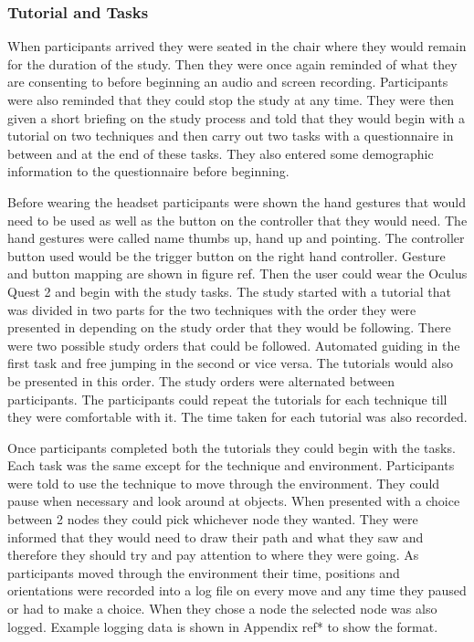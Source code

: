 \subsubsection{Tutorial and Tasks}
\label{subsubsection DPUS SP SP: Tutorial and Tasks}
When participants arrived they were seated in the chair where they would remain for the duration of the study. Then they were once again reminded of what they are consenting to before beginning an audio and screen recording. Participants were also reminded that they could stop the study at any time. They were then given a short briefing on the study process and told that they would begin with a tutorial on two techniques and then carry out two tasks with a questionnaire in between and at the end of these tasks. They also entered some demographic information to the questionnaire before beginning.

Before wearing the headset participants were shown the hand gestures that would need to be used as well as the button on the controller that they would need. The hand gestures were called name thumbs up, hand up and pointing. The controller button used would be the trigger button on the right hand controller. Gesture and button mapping are shown in figure ref. Then the user could wear the Oculus Quest 2 and begin with the study tasks. The study started with a tutorial that was divided in two parts for the two techniques with the order they were presented in depending on the study order that they would be following. There were two possible study orders that could be followed. Automated guiding in the first task and free jumping in the second or vice versa. The tutorials would also be presented in this order. The study orders were alternated between participants. The participants could repeat the tutorials for each technique till they were comfortable with it. The time taken for each tutorial was also recorded. 

Once participants completed both the tutorials they could begin with the tasks. Each task was the same except for the technique and environment. Participants were told to use the technique to move through the environment. They could pause when necessary and look around at objects. When presented with a choice between 2 nodes they could pick whichever node they wanted. They were informed that they would need to draw their path and what they saw and therefore they should try and pay attention to where they were going. As participants moved through the environment their time, positions and orientations were recorded into a log file on every move and any time they paused or had to make a choice. When they chose a node the selected node was also logged. Example logging data is shown in Appendix ref* to show the format.

